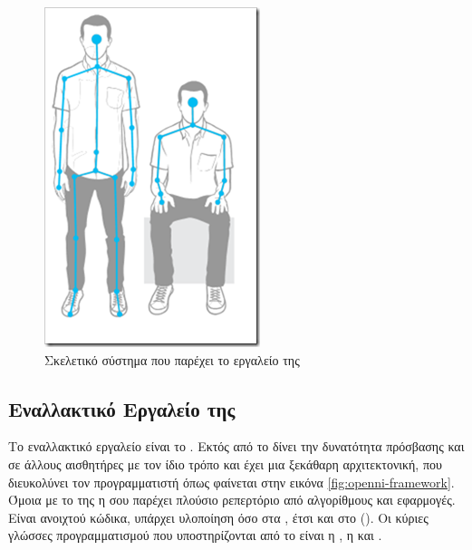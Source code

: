 \begin{figure}[H]
    \centering
    \includegraphics[height=.35\textheight]{kinect/fig/microsoft-skeleton.png}
    \caption{Σκελετικό σύστημα που παρέχει το εργαλείο της \protect\footnotemark}
    \label{fig:microsoft-sdk-skeleton}
\end{figure}

\subsection{\texorpdfstring{Εναλλακτικό Εργαλείο της }{}}

Το εναλλακτικό εργαλείο είναι το . Εκτός από το  δίνει την δυνατότητα πρόσβασης και σε άλλους αισθητήρες με τον ίδιο τρόπο και έχει μια ξεκάθαρη αρχιτεκτονική, που διευκολύνει τον προγραμματιστή όπως φαίνεται στην εικόνα \ref{fig:openni-framework}. Όμοια με το  της  η  σου παρέχει πλούσιο ρεπερτόριο από αλγορίθμους και εφαρμογές. Είναι ανοιχτού κώδικα, υπάρχει υλοποίηση όσο στα , έτσι και στο  (). Οι κύριες γλώσσες προγραμματισμού  που υποστηρίζονται από το  είναι η , η  και .

